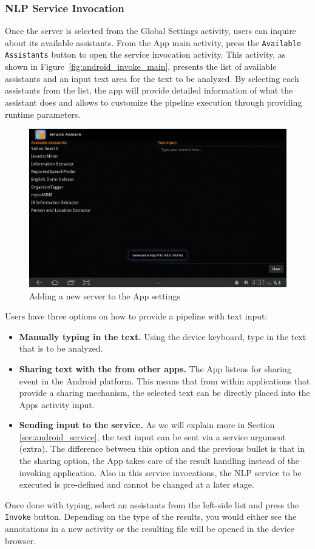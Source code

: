 \subsubsection{NLP Service Invocation}
Once the \sa server is selected from the Global Settings activity, users can inquire about its available assistants. From the \sa App main activity, press the \texttt{Available Assistants} button to open the service invocation activity. This activity, as shown in Figure~\ref{fig:android_invoke_main}, presents the list of available assistants and an input text area for the text to be analyzed. By selecting each assistants from the list, the app will provide detailed information of what the assistant does and allows to customize the pipeline execution through providing runtime parameters.

\begin{figure}[htb]
\centering
\includegraphics[scale=0.35]{pictures/android_invoke_main.jpg}
\caption{Adding a new server to the \sa App settings}
\label{fig:android_new_server}
\end{figure}

Users have three options on how to provide a pipeline with text input:
\begin{itemize}
\item{\textbf{Manually typing in the text. }}{Using the device keyboard, type in the text that is to be analyzed.}
\item{\textbf{Sharing text with the \sa from other apps. }}{The \sa App listens for sharing event in the Android platform. This means that from within applications that provide a sharing mechanism, the selected text can be directly placed into the \sa Apps activity input.}
\item{\textbf{Sending input to the \sa service. }}{As we will explain more in Section \ref{sec:android_service}, the text input can be sent via a service argument (extra). The difference between this option and the previous bullet is that in the sharing option, the \sa App takes care of the result handling instead of the invoking application. Also in this service invocations, the NLP service to be executed is pre-defined and cannot be changed at a later stage.}
\end{itemize}
Once done with typing, select an assistants from the left-side list and press the \texttt{Invoke} button. Depending on the type of the results, you would either see the annotations in a new activity or the resulting file will be opened in the device browser.

